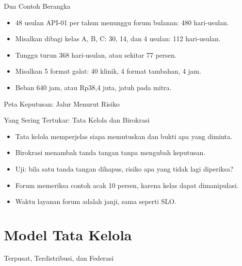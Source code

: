 \documentclass[aspectratio=169, table, 12pt]{beamer}
\begin{document}
\begin{frame}{{\Large Dua Contoh Berangka}}
  \vspace{8pt}
  \begin{itemize}
    \item 48 usulan API-01 per tahun menunggu forum bulanan: 480 hari-usulan.
    \item Misalkan dibagi kelas A, B, C: 30, 14, dan 4 usulan: 112 hari-usulan.
    \item Tunggu turun 368 hari-usulan, atau sekitar 77 persen.
    \item Misalkan 5 format galat: 40 klinik, 4 format tambahan, 4 jam.
    \item Beban 640 jam, atau Rp38,4 juta, jatuh pada mitra.
  \end{itemize}
\end{frame}

\begin{frame}{{\Large Peta Keputusan: Jalur Menurut Risiko}}
  \centering
\end{frame}

\begin{frame}{{\Large Yang Sering Tertukar: Tata Kelola dan Birokrasi}}
  \vspace{8pt}
  \begin{itemize}
    \item Tata kelola memperjelas siapa memutuskan dan bukti apa yang diminta.
    \item Birokrasi menambah tanda tangan tanpa mengubah keputusan.
    \item Uji: bila satu tanda tangan dihapus, risiko apa yang tidak lagi diperiksa?
    \item Forum memeriksa contoh acak 10 persen, karena kelas dapat dimanipulasi.
    \item Waktu layanan forum adalah janji, sama seperti SLO.
  \end{itemize}
\end{frame}

\section{Model Tata Kelola}

\begin{frame}{{\Large Terpusat, Terdistribusi, dan Federasi}}
  \centering
\end{frame}
\end{document}
